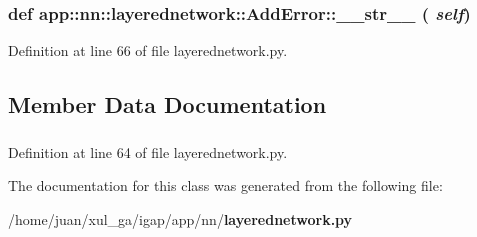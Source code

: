 \subsubsection{\setlength{\rightskip}{0pt plus 5cm}def app::nn::layerednetwork::AddError::\_\-\_\-str\_\-\_\- ( {\em self})}\label{classapp_1_1nn_1_1layerednetwork_1_1AddError_b3fda1fb7a4667a1b33d50c16b2f0000}




Definition at line 66 of file layerednetwork.py.

\subsection{Member Data Documentation}
\subsubsection{}\label{classapp_1_1nn_1_1layerednetwork_1_1AddError_ede08a632871fd9713b9b19734e6060e}




Definition at line 64 of file layerednetwork.py.

The documentation for this class was generated from the following file:\begin{CompactItemize}
\item 
/home/juan/xul\_\-ga/igap/app/nn/{\bf layerednetwork.py}\end{CompactItemize}
